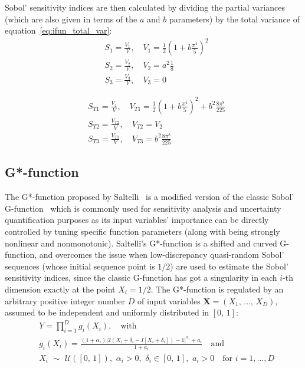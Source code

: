 \vspace{0.2cm}\noindent
Sobol' sensitivity indices are then calculated by dividing the partial variances (which are also given in terms of the $a$ and $b$ parameters) by the total variance of equation~\eqref{eq:ifun_total_var}:
%
\begin{align}
	& S_{1} = \frac{V_{1}}{V},\quad V_{1} = \frac{1}{2}\left(1 + b\frac{\pi^4}{5}\right)^2 \\
	& S_{2} = \frac{V_{2}}{V},\quad V_{2} = a^2\frac{1}{8} \\
	& S_{3} = \frac{V_{3}}{V},\quad V_{3} = 0
\end{align}

\begin{align}
	& S_{T1} = \frac{V_{1}}{V},\quad V_{T1} = \frac{1}{2}\left(1 + b\frac{\pi^4}{5}\right)^2 + b^2\frac{8\pi^8}{225} \\
	& S_{T2} = \frac{V_{T2}}{V},\quad V_{T2} = V_2 \\
	& S_{T3} = \frac{V_{T3}}{V},\quad V_{T3} = b^2\frac{8\pi^8}{225}
\end{align}


%
%
%
\subsection{G*-function}
The G*-function proposed by Saltelli~\cite{Saltelli:2010} is a modified version of the classic Sobol' G-function~\cite{Archer:1997} which is commonly used for sensitivity analysis and uncertainty quantification purposes as its input variables' importance can be directly controlled by tuning specific function parameters (along with being strongly nonlinear and nonmonotonic). Saltelli's G*-function is a shifted and curved G-function, and overcomes the issue when low-discrepancy quasi-random Sobol' sequences (whose initial sequence point is $1/2$) are used to estimate the Sobol' sensitivity indices, since the classic G-function has got a singularity in each $i$-th dimension exactly at the point $X_{i}=1/2$. The G*-function is regulated by an arbitrary positive integer number $D$ of input variables $\mathbf{X}=(X_1,\,\dots,\,X_D)$, assumed to be independent and uniformly distributed in $[0,\,1]$: 
%
\begin{align}\label{eq:gstarfun}
	& Y = \prod_{i=1}^{D}g_i(X_i),\quad\text{with} \\
	& g_i(X_i)=\frac{(1+\alpha_i)\vert 2(X_i+\delta_i-I[X_i+\delta_i])-1\vert^{\alpha_i}+a_i}{1+a_i}\quad\text{and} \\
	& X_i\,\,\sim\,\,\mathcal{U}([0,\,1]),\,\,\alpha_i > 0,\,\,\delta_i\in [0,\,1],\,\,a_i>0\quad\text{for}\,\,i=1,\dots,D
\end{align}

